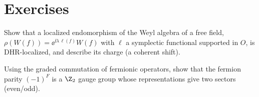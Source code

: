 \section*{Exercises}
\begin{exercise}
Show that a localized endomorphism of the Weyl algebra of a free field, $\rho(W(f))=\ee^{\ii\lambda\,\ell(f)}W(f)$ with $\ell$ a symplectic functional supported in $O$, is DHR-localized, and describe its charge (a coherent shift).
\end{exercise}
\begin{exercise}
Using the graded commutation of fermionic operators, show that the fermion parity $(-1)^F$ is a $\Z_2$ gauge group whose representations give two sectors (even/odd).
\end{exercise}
